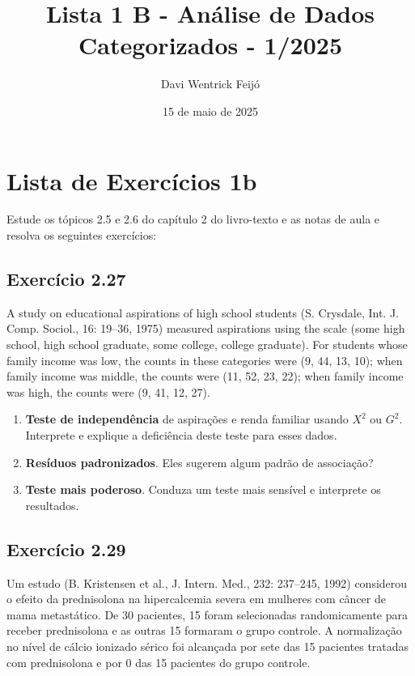 \documentclass[
]{article}
\title{Lista 1 B - Análise de Dados Categorizados - 1/2025}
\author{Davi Wentrick Feijó}
\date{15 de maio de 2025}
\providecommand{\tightlist}{%
  \setlength{\itemsep}{0pt}\setlength{\parskip}{0pt}}
\begin{document}
\maketitle

{
\setcounter{tocdepth}{2}
\tableofcontents
}
\section{Lista de Exercícios 1b}\label{lista-de-exercuxedcios-1b}

Estude os tópicos 2.5 e 2.6 do capítulo 2 do livro-texto e as notas de
aula e resolva os seguintes exercícios:

\subsection{Exercício 2.27}\label{exercuxedcio-2.27}

A study on educational aspirations of high school students (S. Crysdale,
Int. J. Comp. Sociol., 16: 19--36, 1975) measured aspirations using the
scale (some high school, high school graduate, some college, college
graduate). For students whose family income was low, the counts in these
categories were (9, 44, 13, 10); when family income was middle, the
counts were (11, 52, 23, 22); when family income was high, the counts
were (9, 41, 12, 27).

\begin{enumerate}
\def\labelenumi{\arabic{enumi}.}
\tightlist
\item
  \textbf{Teste de independência} de aspirações e renda familiar usando
  \(X^{2}\) ou \(G^{2}\). Interprete e explique a deficiência deste
  teste para esses dados.
\item
  \textbf{Resíduos padronizados}. Eles sugerem algum padrão de
  associação?
\item
  \textbf{Teste mais poderoso}. Conduza um teste mais sensível e
  interprete os resultados.
\end{enumerate}

\subsection{Exercício 2.29}\label{exercuxedcio-2.29}

Um estudo (B. Kristensen et al., J. Intern. Med., 232: 237--245, 1992)
considerou o efeito da prednisolona na hipercalcemia severa em mulheres
com câncer de mama metastático. De 30 pacientes, 15 foram selecionadas
randomicamente para receber prednisolona e as outras 15 formaram o grupo
controle. A normalização no nível de cálcio ionizado sérico foi
alcançada por sete das 15 pacientes tratadas com prednisolona e por 0
das 15 pacientes do grupo controle.
\end{document}
